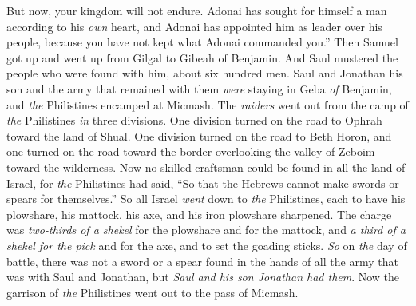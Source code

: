 \begin{biblechapter}
\verse But now, your kingdom will not endure. Adonai has sought for himself a man according to his \textit{own} heart, and Adonai has appointed him as leader over his people, because you have not kept what Adonai commanded you.”
\verse Then Samuel got up and went up from Gilgal to Gibeah of Benjamin. And Saul mustered the people who were found with him, about six hundred men.
\verse Saul and Jonathan his son and the army that remained with them \textit{were} staying in Geba \textit{of} Benjamin, and \textit{the} Philistines encamped at Micmash.
\verse The \textit{raiders} went out from the camp of \textit{the} Philistines \textit{in} three divisions. One division turned on the road to Ophrah toward the land of Shual.
\verse One division turned on the road to Beth Horon, and one turned on the road toward the border overlooking the valley of Zeboim toward the wilderness.
\verse Now no skilled craftsman could be found in all the land of Israel, for \textit{the} Philistines had said, “So that the Hebrews cannot make swords or spears for themselves.”
\verse So all Israel \textit{went} down to \textit{the} Philistines, each to have his plowshare, his mattock, his axe, and his iron plowshare sharpened.
\verse The charge was \textit{two-thirds of a shekel} for the plowshare and for the mattock, and \textit{a third of a shekel for the pick} and for the axe, and to set the goading sticks.
\verse \textit{So} on \textit{the} day of battle, there was not a sword or a spear found in the hands of all the army that was with Saul and Jonathan, but \textit{Saul and his son Jonathan had them}.
\verse Now the garrison of \textit{the} Philistines went out to the pass of Micmash.
\end{biblechapter}

